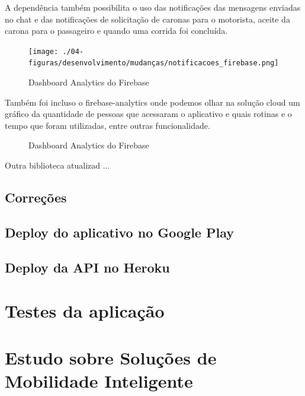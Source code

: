 A dependência também possibilita o uso das notificações das mensagens enviadas no chat e das notificações de solicitação de caronas para o motorista, aceite da carona para o passageiro e quando uma corrida foi concluída.

\begin{figure}[!hbtp]
	\centering
	\caption{Dashboard Analytics do Firebase}
	\texttt{[image: ./04-figuras/desenvolvimento/mudanças/notificacoes\_firebase.png]}
	\label{fig:8}
\end{figure}

Também foi incluso o firebase-analytics onde podemos olhar na solução cloud um gráfico da quantidade de pessoas que acessaram o aplicativo e quais rotinas e o tempo que foram utilizadas, entre outras funcionalidade.

\begin{figure}[h]
	\center
	\qquad
	\caption{Dashboard Analytics do Firebase}
\end{figure}

Outra biblioteca atualizad ...
	
\subsection{Correções}
\subsection{Deploy do aplicativo no Google Play}
\subsection{Deploy da API no Heroku}


\section{Testes da aplicação}

\section{Estudo sobre Soluções de Mobilidade Inteligente}

